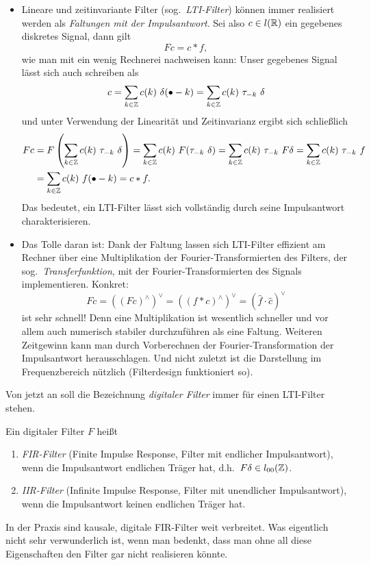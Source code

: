 \begin{remark}\leavevmode
\begin{itemize}
\item Lineare und zeitinvariante Filter (sog.\ \emph{LTI-Filter}) können immer realisiert 
werden als \emph{Faltungen mit der Impulsantwort}. Sei also $ c \in l(\mathbb{R}) $ ein gegebenes diskretes 
Signal, dann gilt
\[
  Fc = c * f,
\]
wie man mit ein wenig Rechnerei nachweisen kann: Unser gegebenes Signal lässt sich auch schreiben
als
\[
  c = \sum_{k \in \Z} c(k) \ \delta(\bullet - k) = \sum_{k \in \Z} c(k) \ \tau_{-k} \ \delta
\]
und unter Verwendung der Linearität und Zeitinvarianz ergibt sich schließlich
\begin{align*}
   Fc
&= F \left( \sum_{k \in \mathbb{Z}} c(k) \ \tau_{-k} \ \delta \right) 
 = \sum_{k \in \mathbb{Z}} c(k) \ F(\tau_{-k} \ \delta)
 = \sum_{k \in \mathbb{Z}} c(k) \ \tau_{-k} \ F \delta
 = \sum_{k \in \mathbb{Z}} c(k) \ \tau_{-k} \ f \\
&= \sum_{k \in \mathbb{Z}} c(k) \ f(\bullet - k) = c * f.
\end{align*}
Das bedeutet, ein LTI-Filter lässt sich vollständig durch seine Impulsantwort charakterisieren.
\item Das Tolle daran ist: Dank der Faltung lassen sich LTI-Filter effizient am Rechner über eine 
Multiplikation der Fourier-Transformierten des Filters, der sog.\ \emph{Transferfunktion}, mit
der Fourier-Transformierten des Signals implementieren. Konkret:
\[
  Fc = \left( (Fc)^{\wedge} \right)^{\vee} = \left( (f * c)^{\wedge} \right)^{\vee}
     = \left( \widehat{f} \cdot \widehat{c} \right)^{\vee}
\]
ist sehr schnell! Denn eine Multiplikation ist wesentlich schneller und vor allem auch numerisch
stabiler durchzuführen als eine Faltung. Weiteren Zeitgewinn kann man durch Vorberechnen der
Fourier-Transformation der Impulsantwort herausschlagen. Und nicht zuletzt ist die Darstellung im
Frequenzbereich nützlich (Filterdesign funktioniert so).
\end{itemize}
\end{remark}

Von jetzt an soll die Bezeichnung \emph{digitaler Filter} immer für einen LTI-Filter stehen.

\begin{definition}
Ein digitaler Filter $ F $ heißt
\begin{enumerate}
\item \emph{FIR-Filter} (Finite Impulse Response, Filter mit endlicher Impulsantwort), wenn die
  Impulsantwort endlichen Träger hat, d.h.\ $ F\delta \in l_{00}(\mathbb{Z}) $.
\item \emph{IIR-Filter} (Infinite Impulse Response, Filter mit unendlicher Impulsantwort), wenn die
  Impulsantwort keinen endlichen Träger hat.
\end{enumerate}
\end{definition}

\begin{example}
In der Praxis sind kausale, digitale FIR-Filter weit verbreitet. Was eigentlich nicht sehr 
verwunderlich ist, wenn man bedenkt, dass man ohne all diese Eigenschaften den Filter gar nicht
realisieren könnte.
\end{example}
